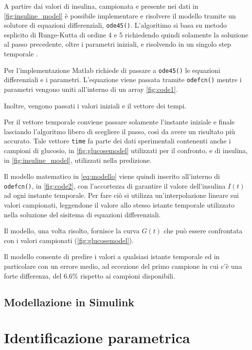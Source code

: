 A partire dai valori di insulina, campionata e presente nei dati in \cref{fig:insuline_model} è possibile implementare e risolvere il modello tramite un solutore di equazioni differenziali, \texttt{ode45()}. L'algoritimo si basa su metodo esplicito di Runge-Kutta di ordine 4 e 5 richiedendo quindi solamente la soluzione al passo precedente, oltre i parametri iniziali, e risolvendo in un singolo step temporale \cite{ode45}.

Per l'implementazione Matlab richiede di passare a \texttt{ode45()} le equazioni differenziali e i parametri. L'equazione viene passata tramite \texttt{odefcn()} mentre i parametri vengono uniti all'interno di un array \cref{fig:code1}. 

Inoltre, vengono passati i valori iniziali e il vettore dei tempi. 

Per il vettore temporale conviene passare solamente l'instante iniziale e finale lasciando l'algoritmo libero di scegliere il passo, così da avere un risultato più accurato. Tale vettore \texttt{time} fa parte dei dati sperimentali contenenti anche i campioni di glucosio, in \cref{fig:glucosemodel} utilizzati per il confronto, e di insulina, in \cref{fig:insuline_model}, utilizzati nella predizione.

Il modello matematico in \cref{eq:modello} viene quindi inserito all'interno di \texttt{odefcn()}, in \cref{fig:code2}, con l'accortezza di garantire il valore dell'insulina $I(t)$ ad ogni instante temporale. Per fare ciò si utilizza un'interpolazione lineare sui valori campionati, leggendone il valore allo stesso istante temporale utilizzato nella soluzione del sisitema di equazioni differenziali.



Il modello, una volta risolto, fornisce la curva $G(t)$ che può essere confrontata con i valori campionati (\cref{fig:glucosemodel}). 

Il modello consente di predire i valori a qualsiasi istante temporale ed in particolare con un errore medio, ad eccezione del primo campione in cui c'è una forte differenza, del 6.6\% rispetto ai campioni disponibili.

\subsection{Modellazione in Simulink}


\textcolor{blue}{\lipsum[1-2]}

\section{Identificazione parametrica}


